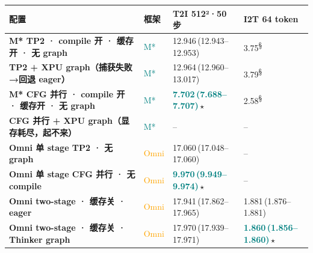 \begin{tabularx}{\textwidth}{>{\bfseries}p{5.9cm} p{0.9cm} Y Y}
\toprule
{}
配置 & 框架 & T2I 512²·50 步 & I2T 64 token \\
\midrule
M* TP2 · compile 开 · 缓存开 · 无 graph & \textcolor{Teal}{M*} & 12.946\,\textcolor{Muted}{(12.943--12.953)} & \textcolor{Muted}{3.75\textsuperscript{§}} \\
TP2 + XPU graph（捕获失败→回退 eager） & \textcolor{Teal}{M*} & 12.964\,\textcolor{Muted}{(12.960--13.017)} & \textcolor{Muted}{3.79\textsuperscript{§}} \\
M* CFG 并行 · compile 开 · 缓存开 · 无 graph & \textcolor{Teal}{M*} & \textbf{\textcolor{Teal}{7.702\,\textcolor{Muted}{(7.688--7.707)}}}\,$\star$ & \textcolor{Muted}{2.58\textsuperscript{§}} \\
CFG 并行 + XPU graph（显存耗尽，起不来） & \textcolor{Teal}{M*} & -- & -- \\
\midrule
Omni 单 stage TP2 · 无 graph & \textcolor{Orange}{Omni} & 17.060\,\textcolor{Muted}{(17.048--17.060)} & -- \\
Omni 单 stage CFG 并行 · 无 compile & \textcolor{Orange}{Omni} & \textbf{\textcolor{Teal}{9.970\,\textcolor{Muted}{(9.949--9.974)}}}\,$\star$ & -- \\
Omni two-stage · 缓存关 · eager & \textcolor{Orange}{Omni} & 17.941\,\textcolor{Muted}{(17.862--17.965)} & 1.881\,\textcolor{Muted}{(1.876--1.881)} \\
Omni two-stage · 缓存关 · Thinker graph & \textcolor{Orange}{Omni} & 17.970\,\textcolor{Muted}{(17.939--17.971)} & \textbf{\textcolor{Teal}{1.860\,\textcolor{Muted}{(1.856--1.860)}}}\,$\star$ \\
\bottomrule
\end{tabularx}
